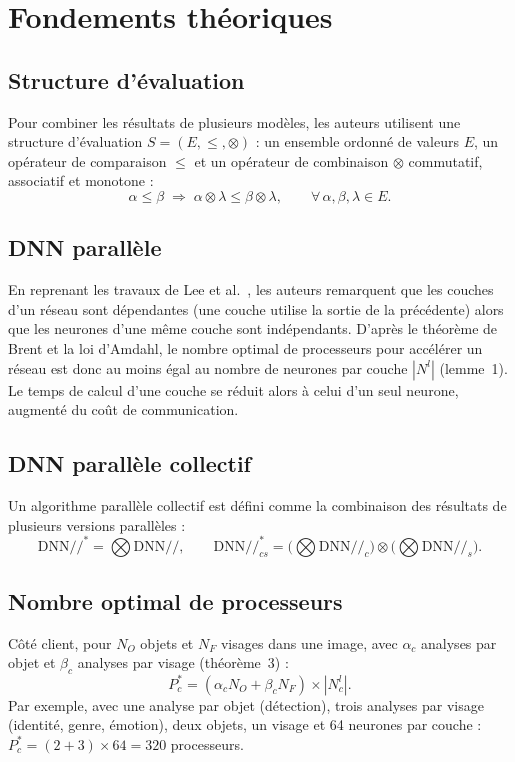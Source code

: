 \documentclass[11pt,a4paper]{report}
\newcommand{\dnnc}{\ensuremath{\mathrm{DNN}/\!/_{c}}}
\newcommand{\dnns}{\ensuremath{\mathrm{DNN}/\!/_{s}}}
\begin{document}
\section{Fondements théoriques}

\subsection{Structure d'évaluation}
Pour combiner les résultats de plusieurs modèles, les auteurs utilisent une structure d'évaluation $S = (E, \le, \otimes)$ : un ensemble ordonné de valeurs $E$, un opérateur de comparaison $\le$ et un opérateur de combinaison $\otimes$ commutatif, associatif et monotone :
\begin{equation}
  \alpha \le \beta \;\Rightarrow\; \alpha \otimes \lambda \le \beta \otimes \lambda,
  \qquad \forall\, \alpha,\beta,\lambda \in E.
\end{equation}

\subsection{DNN parallèle}
En reprenant les travaux de Lee et al.~\cite{lee2017}, les auteurs remarquent que les couches d'un réseau sont dépendantes (une couche utilise la sortie de la précédente) alors que les neurones d'une même couche sont indépendants. D'après le théorème de Brent et la loi d'Amdahl, le nombre optimal de processeurs pour accélérer un réseau est donc au moins égal au nombre de neurones par couche $|N^l|$ (lemme~1). Le temps de calcul d'une couche se réduit alors à celui d'un seul neurone, augmenté du coût de communication.

\subsection{DNN parallèle collectif}
Un algorithme \og parallèle collectif \fg{} est défini comme la combinaison des résultats de plusieurs versions parallèles :
\begin{equation}
  \mathrm{DNN}/\!/^{*} = \bigotimes \mathrm{DNN}/\!/,
  \qquad
  \mathrm{DNN}/\!/^{*}_{cs} = \Big(\bigotimes \dnnc\Big) \otimes \Big(\bigotimes \dnns\Big).
\end{equation}

\subsection{Nombre optimal de processeurs}
Côté client, pour $N_O$ objets et $N_F$ visages dans une image, avec $\alpha_c$ analyses par objet et $\beta_c$ analyses par visage (théorème~3) :
\begin{equation}
  P^{*}_{c} = (\alpha_c N_O + \beta_c N_F)\times |N^{l}_{c}|.
\end{equation}
Par exemple, avec une analyse par objet (détection), trois analyses par visage (identité, genre, émotion), deux objets, un visage et 64 neurones par couche : $P^{*}_{c} = (2 + 3)\times 64 = 320$ processeurs.
\end{document}
